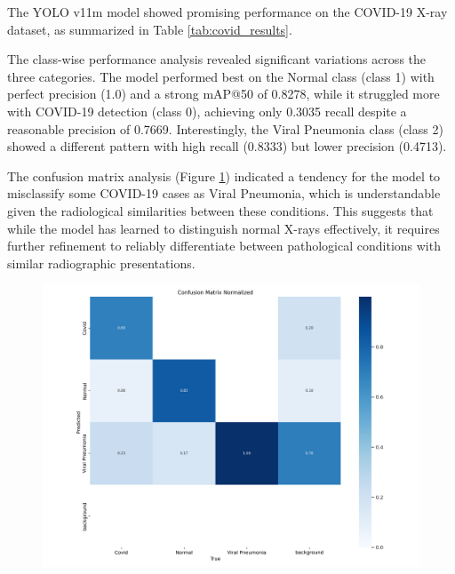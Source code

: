 \begin{multicols}{2}
The YOLO v11m model showed promising performance on the COVID-19 X-ray dataset, as summarized in Table \ref{tab:covid_results}.

The class-wise performance analysis revealed significant variations across the three categories. The model performed best on the Normal class (class 1) with perfect precision (1.0) and a strong mAP@50 of 0.8278, while it struggled more with COVID-19 detection (class 0), achieving only 0.3035 recall despite a reasonable precision of 0.7669. Interestingly, the Viral Pneumonia class (class 2) showed a different pattern with high recall (0.8333) but lower precision (0.4713).
\end{multicols}

\begin{multicols}{2}
The confusion matrix analysis (Figure \ref{fig:covid_confusion}) indicated a tendency for the model to misclassify some COVID-19 cases as Viral Pneumonia, which is understandable given the radiological similarities between these conditions. This suggests that while the model has learned to distinguish normal X-rays effectively, it requires further refinement to reliably differentiate between pathological conditions with similar radiographic presentations.
\end{multicols}

\begin{figure}[ht]
    \centering
    \includegraphics[width=1\textwidth]{datas/x_ray_summary_datas/x_ray_confusion_matrix_normalized.png}
    \label{fig:covid_confusion}
\end{figure}

